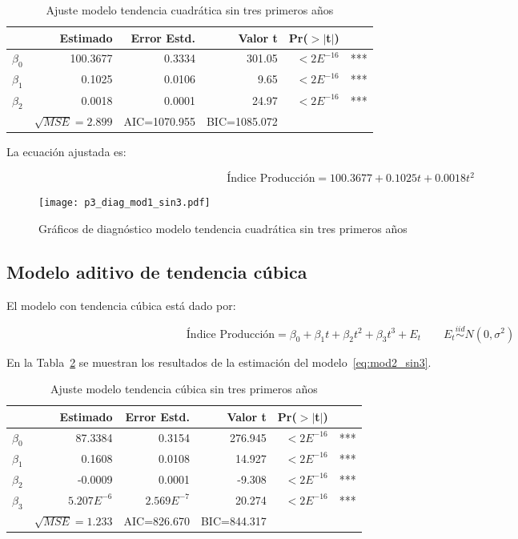 \documentclass{tufte-handout}
\begin{document}
\begin{table}[ht]
\centering
\begin{tabular}{lrrrrl}
            & Estimado & Error Estd. & Valor t & Pr($>$$|$t$|$) & \\ 
  \hline
  $\beta_0$ & 100.3677 & 0.3334 & 301.05 & $< 2E^{-16}$ & *** \\ 
  $\beta_1$ & 0.1025 & 0.0106 & 9.65 & $< 2E^{-16}$ & *** \\ 
  $\beta_2$ & 0.0018 & 0.0001 & 24.97 & $< 2E^{-16}$ & *** \\ 
   \hline
   & $\sqrt{MSE}=2.899$ & AIC=1070.955 & BIC=1085.072 & \\
   \hline
\end{tabular}
\caption{Ajuste modelo tendencia cuadrática sin tres primeros años} 
\label{tab:mod1_sin3}
\end{table}

La ecuación ajustada es:

\begin{equation}
	\text{Índice Producción} = 100.3677 + 0.1025 t + 0.0018 t^2
\end{equation}

\begin{figure*}[!ht]
    \texttt{[image: p3\_diag\_mod1\_sin3.pdf]}
    \caption{Gráficos de diagnóstico modelo tendencia cuadrática sin tres primeros años}
    \label{fig:p3_diag_mod1_sin3.pdf}
\end{figure*}

\subsection*{Modelo aditivo de tendencia cúbica}

El modelo con tendencia cúbica está dado por:

\begin{equation} \label{eq:mod2_sin3}
	\text{Índice Producción} = \beta_0 + \beta_1 t + \beta_2 t^2 + \beta_3 t^3 + E_t
	\qquad E_t \stackrel{iid}{\sim} N(0, \sigma^2)
\end{equation}

En la Tabla~\ref{tab:mod2_sin3} se muestran los resultados de la estimación del modelo~\ref{eq:mod2_sin3}.

\begin{table}[ht]
\centering
\begin{tabular}{lrrrrl}
          & Estimado & Error Estd. & Valor t & Pr($>$$|$t$|$) & \\ 
  \hline
$\beta_0$ & 87.3384 & 0.3154 & 276.945 & $<2E^{-16}$ & *** \\ 
  $\beta_1$ & 0.1608 & 0.0108 & 14.927 & $<2E^{-16}$ & *** \\ 
  $\beta_2$ & -0.0009 & 0.0001 & -9.308 & $<2E^{-16}$ & *** \\ 
  $\beta_3$ & $5.207E^{-6}$ & $2.569E^{-7}$ & 20.274 & $<2E^{-16}$ & *** \\ 
   \hline
   & $\sqrt{MSE}=1.233$ & AIC=826.670 & BIC=844.317 & \\
   \hline
\end{tabular}
\caption{Ajuste modelo tendencia cúbica sin tres primeros años} 
\label{tab:mod2_sin3}
\end{table}
\end{document}

